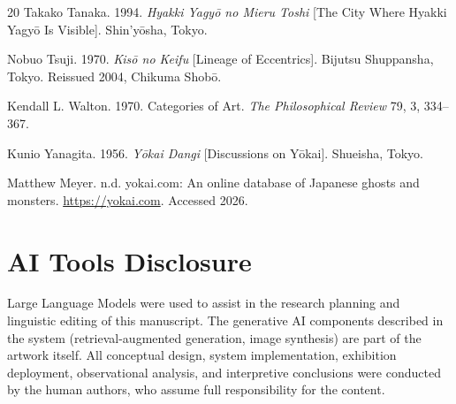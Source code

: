 \documentclass[manuscript,review,anonymous,nonacm]{acmart}
\begin{document}
\begin{thebibliography}{20}
Takako Tanaka. 1994.
\textit{Hyakki Yagy\=o no Mieru Toshi} [The City Where Hyakki Yagy\=o Is Visible].
Shin'y\=osha, Tokyo.

Nobuo Tsuji. 1970.
\textit{Kis\=o no Keifu} [Lineage of Eccentrics].
Bijutsu Shuppansha, Tokyo. Reissued 2004, Chikuma Shob\=o.

Kendall L. Walton. 1970.
Categories of Art.
\textit{The Philosophical Review} 79, 3, 334--367.

Kunio Yanagita. 1956.
\textit{Y\=okai Dangi} [Discussions on Y\=okai].
Shueisha, Tokyo.

Matthew Meyer. n.d.
yokai.com: An online database of Japanese ghosts and monsters.
\url{https://yokai.com}. Accessed 2026.

\end{thebibliography}


\section*{AI Tools Disclosure}
Large Language Models were used to assist in the research planning and linguistic editing of this manuscript. The generative AI components described in the system (retrieval-augmented generation, image synthesis) are part of the artwork itself. All conceptual design, system implementation, exhibition deployment, observational analysis, and interpretive conclusions were conducted by the human authors, who assume full responsibility for the content.
\end{document}

